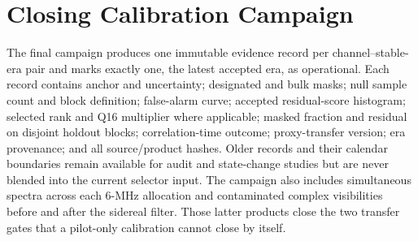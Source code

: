 \section{Closing Calibration Campaign}
\label{sec:calibration:closing}

The final campaign produces one immutable evidence record per channel--stable-era
pair and marks exactly one, the latest accepted era, as operational.  Each record
contains anchor and uncertainty; designated and bulk masks; null sample count and
block definition; false-alarm curve; accepted residual-score histogram; selected
rank and Q16 multiplier where applicable; masked fraction and residual on disjoint
holdout blocks; correlation-time outcome; proxy-transfer version; era provenance;
and all source/product hashes.  Older records and their calendar boundaries remain
available for audit and state-change studies but are never blended into the current
selector input.  The campaign also includes simultaneous spectra
across each 6-MHz allocation and contaminated complex visibilities before and
after the sidereal filter.  Those latter products close the two transfer gates
that a pilot-only calibration cannot close by itself.
